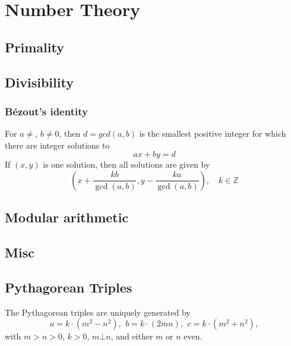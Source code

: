 \chapter{Number Theory}



\section{Primality}

\section{Divisibility}
    \subsection{Bézout's identity}
    For $a \neq $, $b \neq 0$, then $d=gcd(a,b)$ is the smallest positive integer for which there are integer solutions to
    $$ax+by=d$$
    If $(x,y)$ is one solution, then all solutions are given by
    $$\left(x+\frac{kb}{\gcd(a,b)}, y-\frac{ka}{\gcd(a,b)}\right), \quad k\in\mathbb{Z}$$

\section{Modular arithmetic}

\section {Misc}

\section{Pythagorean Triples}
 The Pythagorean triples are uniquely generated by
 \[ a=k\cdot (m^{2}-n^{2}),\ \,b=k\cdot (2mn),\ \,c=k\cdot (m^{2}+n^{2}), \]
 with $m > n > 0$, $k > 0$, $m \bot n$, and either $m$ or $n$ even.

